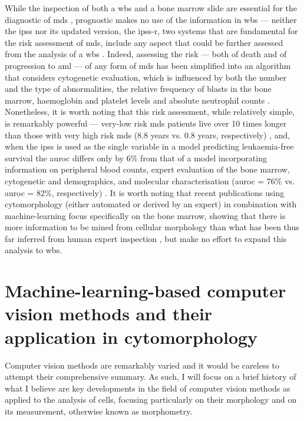 While the inspection of both a \ac{wbs} and a bone marrow slide are essential for the diagnostic of \ac{mds} \cite{Greenberg2012-en,Arber2016-os}, prognostic makes no use of the information in \ac{wbs} --- neither the \ac{ipss} nor its updated version, the \ac{ipss-r}, two systems that are fundamental for the risk assessment of \ac{mds}, include any aspect that could be further assessed from the analysis of a \ac{wbs} \cite{Greenberg2012-en}. Indeed, assessing the risk --- both of death and of progression to \ac{aml} --- of any form of \ac{mds} has been simplified into an algorithm that considers cytogenetic evaluation, which is influenced by both the number and the type of abnormalities, the relative frequency of blasts in the bone marrow, haemoglobin and platelet levels and absolute neutrophil counts \cite{Greenberg2012-en}. Nonetheless, it is worth noting that this risk assessment, while relatively simple, is remarkably powerful --- very-low risk \ac{mds} patients live over 10 times longer than those with very high risk \ac{mds} (8.8 years vs. 0.8 years, respectively) \cite{Greenberg2012-en}, and, when the \ac{ipss} is used as the single variable in a model predicting leukaemia-free survival the \ac{auroc} differs only by 6\% from that of a model incorporating information on peripheral blood counts, expert evaluation of the bone marrow, cytogenetic and demographics, and molecular characterisation (\ac{auroc} = 76\% vs. \ac{auroc} = 82\%, respectively) \cite{Abelson2018}. It is worth noting that recent publications using cytomorphology (either automated or derived by an expert) in combination with machine-learning focus specifically on the bone marrow, showing that there is more information to be mined from cellular morphology than what has been thus far inferred from human expert inspection \cite{Bruck2021-fx,Nagata2020-lh}, but make no effort to expand this analysis to \ac{wbs}. 

\section{Machine-learning-based computer vision methods and their application in cytomorphology}

Computer vision methods are remarkably varied and it would be careless to attempt their comprehensive summary. As such, I will focus on a brief history of what I believe are key developments in the field of computer vision methods as applied to the analysis of cells, focusing particularly on their morphology and on its measurement, otherwise known as morphometry.

